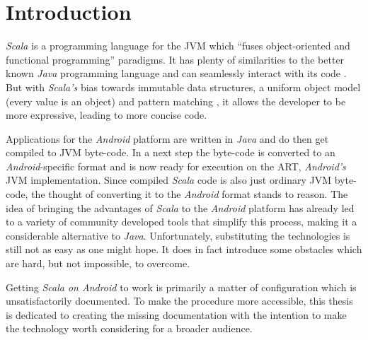 \section{Introduction}

\textit{Scala} is a programming language for the \acf{JVM} which \enquote{fuses object-oriented and functional programming} \cite[p. 1]{odersky04} paradigms. It has plenty of similarities to the better known \textit{Java} programming language and can seamlessly interact with its code \cite[p. 2]{odersky04}. But with \textit{Scala's} bias towards immutable data structures, a uniform object model (every value is an object) \cite[p. 3]{odersky04} and pattern matching \cite[p. 13]{odersky04}, it allows the developer to be more expressive, leading to more concise code.

Applications for the \textit{Android} platform are written in \textit{Java} and do then get compiled to \ac{JVM} byte-code. In a next step the byte-code is converted to an \textit{Android}-specific format and is now ready for execution on the \acf{ART}, \textit{Android's} \ac{JVM} implementation. Since compiled \textit{Scala} code is also just ordinary \ac{JVM} byte-code, the thought of converting it to the \textit{Android} format stands to reason. The idea of bringing the advantages of \textit{Scala} to the \textit{Android} platform has already led to a variety of community developed tools that simplify this process, making it a considerable alternative to \textit{Java}. Unfortunately, substituting the technologies is still not as easy as one might hope. It does in fact introduce some obstacles which are hard, but not impossible, to overcome.

Getting \textit{Scala on Android} to work is primarily a matter of configuration which is unsatisfactorily documented. To make the procedure more accessible, this thesis is dedicated to creating the missing documentation with the intention to make the technology worth considering for a broader audience.